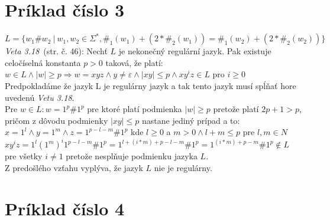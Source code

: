 \documentclass[11pt,a4paper]{article}
\begin{document}
\newpage
\section{Príklad číslo 3}
$L = \{ w_1\#w_2\ |\ w_1,w_2 \in \Sigma^*, \#_1(w_1) + (2 * \#_2(w_1)) = \#_1(w_2) + (2 * \#_2(w_2))\}$\\

\textit{Veta 3.18}~\cite{TIN}(str. č. 46): Nechť $L$ je nekonečný regulární jazyk. Pak existuje celočíselná konstanta $p>0$ taková, že platí: $w \in L \wedge |w| \geq p \Rightarrow w = xyz \wedge y \neq \varepsilon \wedge |xy| \leq p \wedge xy^iz \in L$ pro $i \geq 0$\\

Predpokladáme že jazyk L je regulárny jazyk a tak tento jazyk musí spĺňať hore uvedenú \textit{Vetu 3.18}.\\

Pre $w \in L: w=1^p\#1^p$ pre ktoré platí podmienka $|w| \geq p$ pretože platí $2p+1>p$, pričom z dôvodu podmienky $|xy| \leq p$ nastane jediný prípad a to:\\

$x=1^l \wedge y=1^m \wedge z=1^{p-l-m}\#1^p$ kde $l \geq 0$ a $m > 0 \wedge l+m \leq p$ pre $l,m \in N$\\

$xy^iz = 1^l(1^{m})^i1^{p-l-m}\#1^p = 1^{l+(i*m)+p-l-m}\#1^p = 1^{(i*m)+p-m}\#1^p \notin L$ pre všetky $i \neq 1$ pretože nesplňuje podmienku jazyka $L$.\\

Z predošlého vzťahu vyplýva, že jazyk $L$ nie je regulárny.




\section{Príklad číslo 4}
\end{document}
